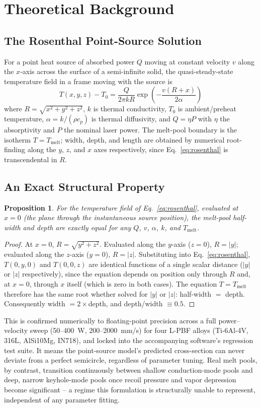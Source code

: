 \documentclass[12pt]{article}
\newtheorem{proposition}{Proposition}
\begin{document}
\section{Theoretical Background}

\subsection{The Rosenthal Point-Source Solution}
For a point heat source of absorbed power $Q$ moving at constant velocity $v$ along the $x$-axis across the surface of a semi-infinite solid, the quasi-steady-state temperature field in a frame moving with the source is
\begin{equation}
T(x,y,z) - T_0 = \frac{Q}{2\pi k R}\exp\!\left(-\frac{v(R+x)}{2\alpha}\right)
\label{eq:rosenthal}
\end{equation}
where $R=\sqrt{x^2+y^2+z^2}$, $k$ is thermal conductivity, $T_0$ is ambient/preheat temperature, $\alpha=k/(\rho c_p)$ is thermal diffusivity, and $Q=\eta P$ with $\eta$ the absorptivity and $P$ the nominal laser power. The melt-pool boundary is the isotherm $T=T_{\text{melt}}$; width, depth, and length are obtained by numerical root-finding along the $y$, $z$, and $x$ axes respectively, since Eq.~\ref{eq:rosenthal} is transcendental in $R$.

\subsection{An Exact Structural Property}
\begin{proposition}
For the temperature field of Eq.~\ref{eq:rosenthal}, evaluated at $x=0$ (the plane through the instantaneous source position), the melt-pool half-width and depth are exactly equal for any $Q$, $v$, $\alpha$, $k$, and $T_{\text{melt}}$.
\end{proposition}
\begin{proof}
At $x=0$, $R=\sqrt{y^2+z^2}$. Evaluated along the $y$-axis ($z=0$), $R=|y|$; evaluated along the $z$-axis ($y=0$), $R=|z|$. Substituting into Eq.~\ref{eq:rosenthal}, $T(0,y,0)$ and $T(0,0,z)$ are identical functions of a single scalar distance ($|y|$ or $|z|$ respectively), since the equation depends on position only through $R$ and, at $x=0$, through $x$ itself (which is zero in both cases). The equation $T=T_{\text{melt}}$ therefore has the same root whether solved for $|y|$ or $|z|$: half-width $=$ depth. Consequently width $=2\times$depth, and depth/width $\equiv 0.5$.
\end{proof}
This is confirmed numerically to floating-point precision across a full power--velocity sweep (50--400~W, 200--2000~mm/s) for four L-PBF alloys (Ti-6Al-4V, 316L, AlSi10Mg, IN718), and locked into the accompanying software's regression test suite. It means the point-source model's predicted cross-section can never deviate from a perfect semicircle, regardless of parameter tuning. Real melt pools, by contrast, transition continuously between shallow conduction-mode pools and deep, narrow keyhole-mode pools once recoil pressure and vapor depression become significant \cite{khairallah2016} -- a regime this formulation is structurally unable to represent, independent of any parameter fitting.
\end{document}
